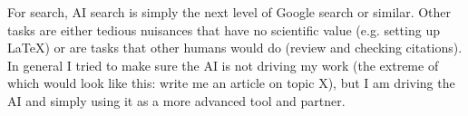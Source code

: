 \documentclass[conference]{IEEEtran}
\begin{document}
For search, AI search is simply the next level of Google search or similar. Other tasks are either tedious nuisances that have no scientific value (e.g. setting up LaTeX) or are tasks that other humans would do (review and checking citations). In general I tried to make sure the AI is not driving my work (the extreme of which would look like this: write me an article on topic X), but I am driving the AI and simply using it as a more advanced tool and partner.  




\vspace{12pt}
\end{document}
